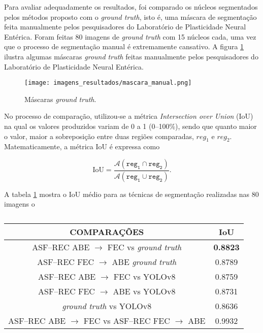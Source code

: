 Para avaliar adequadamente os resultados, foi comparado os núcleos segmentados pelos métodos proposto com o \textit{ground truth}, isto é, uma máscara de segmentação feita manualmente pelos pesquisadores do Laboratório de Plasticidade Neural Entérica. Foram feitas 80 imagens de \textit{ground truth} com 15 núcleos cada, uma vez que o processo de segmentação manual é extremamente cansativo. A figura \ref{fig:mascara_manual} ilustra algumas máscaras \textit{ground truth} feitas manualmente pelos pesquisadores do Laboratório de Plasticidade Neural Entérica.

\begin{figure}[!h]
    \centering
    \texttt{[image: imagens\_resultados/mascara\_manual.png]}
    \caption{Máscaras \textit{ground truth}.}
    \label{fig:mascara_manual}
\end{figure}

No processo de comparação, utilizou-se a métrica \textit{Intersection over Union} (IoU) na qual os valores produzidos variam de 0 a 1 (0–100\%), sendo que quanto maior o valor, maior a sobreposição entre duas regiões comparadas, $reg_1$ e $reg_2$. Matematicamente, a métrica IoU é expressa como

\begin{equation}
	\textrm{IoU} = \frac{\mathcal{A}(\mathtt{reg_1 \cap reg_2})}{\mathcal{A}(\mathtt{reg_1\cup reg_2})}.
	\label{eq:IoU}
\end{equation}

A tabela \ref{tab:resultados-geral} mostra o IoU médio para as técnicas de segmentação realizadas nas 80 imagens o

\begin{table}[h]
    \centering
    \caption{}
    \begin{tabular}{c|c}
        \hline
        \textbf{COMPARAÇÕES} & \textbf{IoU} \\
        \hline    
        ASF–REC ABE $\rightarrow$ FEC vs \textit{ground truth} & \textbf{0.8823}\\
        \hline  
        ASF–REC FEC $\rightarrow$ ABE \textit{ground truth} & 0.8789\\
        \hline
        ASF–REC ABE $\rightarrow$ FEC vs YOLOv8 & 0.8759\\
        \hline
        ASF–REC FEC $\rightarrow$ ABE vs YOLOv8 & 0.8731\\
        \hline
        \textit{ground truth} vs YOLOv8 & 0.8636\\
        \hline
        ASF–REC ABE $\rightarrow$ FEC vs ASF–REC FEC $\rightarrow$ ABE & 0.9932 \\
        \hline
    \end{tabular}
    \label{tab:resultados-geral}
\end{table}


